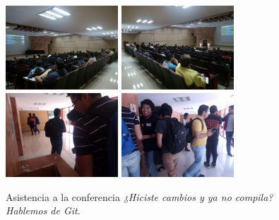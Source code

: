 \documentclass[a4paper,11pt]{article}                 %
\begin{document}
           \begin{figure}[H]
    \begin{center}
      \includegraphics[width=0.375\textwidth]{images/git-02}
      \includegraphics[width=0.375\textwidth]{images/git-03}
      \includegraphics[width=0.375\textwidth]{images/git-01}
      \includegraphics[width=0.375\textwidth]{images/git-04}
      \caption{Asistencia a la conferencia \textit{¿Hiciste cambios y ya no compila? Hablemos de Git}.}
      \label{fig:git}
    \end{center}
  \end{figure}  
  
\end{document}
